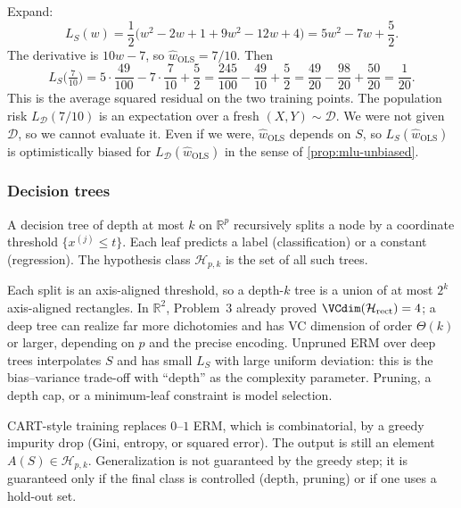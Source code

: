 \begin{solution}
Expand:
\[
L_S(w)
=
\frac12\bigl(w^2-2w+1+9w^2-12w+4\bigr)
=
5w^2-7w+\frac52.
\]
The derivative is $10w-7$, so $\widehat{w}_{\mathrm{OLS}}=7/10$. Then
\[
L_S\bigl(\tfrac{7}{10}\bigr)
=
5\cdot\frac{49}{100}-7\cdot\frac{7}{10}+\frac52
=
\frac{245}{100}-\frac{49}{10}+\frac52
=
\frac{49}{20}-\frac{98}{20}+\frac{50}{20}
=
\frac{1}{20}.
\]
This is the average squared residual on the two training points. The population risk $L_{\mathcal{D}}(7/10)$ is an expectation over a fresh $(X,Y)\sim\mathcal{D}$. We were not given $\mathcal{D}$, so we cannot evaluate it. Even if we were, $\widehat{w}_{\mathrm{OLS}}$ depends on $S$, so $L_S(\widehat{w}_{\mathrm{OLS}})$ is optimistically biased for $L_{\mathcal{D}}(\widehat{w}_{\mathrm{OLS}})$ in the sense of \cref{prop:mlu-unbiased}.
\end{solution}


\subsubsection{Decision trees}
\label{subsubsec:mlu-trees}

\begin{definition}
\label{def:mlu-tree}
A decision tree of depth at most $k$ on $\mathbb{R}^p$ recursively splits a node by a coordinate threshold $\{x^{(j)}\le t\}$. Each leaf predicts a label (classification) or a constant (regression). The hypothesis class $\mathcal{H}_{p,k}$ is the set of all such trees.
\end{definition}

\begin{property}
\label{prop:mlu-tree-vc}
Each split is an axis-aligned threshold, so a depth-$k$ tree is a union of at most $2^k$ axis-aligned rectangles. In $\mathbb{R}^2$, Problem~3 already proved $\VCdim(\mathcal{H}_{\mathrm{rect}})=4$; a deep tree can realize far more dichotomies and has VC dimension of order $\Theta(k)$ or larger, depending on $p$ and the precise encoding. Unpruned ERM over deep trees interpolates $S$ and has small $L_S$ with large uniform deviation: this is the bias--variance trade-off with ``depth'' as the complexity parameter. Pruning, a depth cap, or a minimum-leaf constraint is model selection.
\end{property}

\begin{remark}
CART-style training replaces $0$--$1$ ERM, which is combinatorial, by a greedy impurity drop (Gini, entropy, or squared error). The output is still an element $A(S)\in\mathcal{H}_{p,k}$. Generalization is not guaranteed by the greedy step; it is guaranteed only if the final class is controlled (depth, pruning) or if one uses a hold-out set.
\end{remark}

